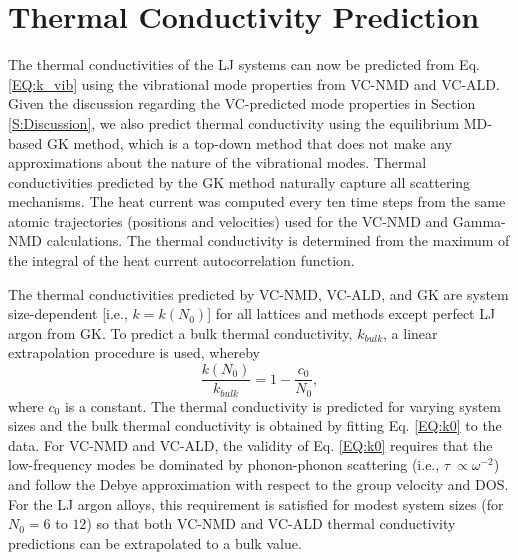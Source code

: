 

\section{\label{S:Thermal Conductivity}Thermal Conductivity Prediction}

The thermal conductivities of the LJ systems can now be predicted from 
Eq. \eqref{EQ:k_vib} using the vibrational mode properties 
from VC-NMD and VC-ALD. Given the discussion regarding the 
VC-predicted mode properties in Section \ref{S:Discussion}, 
we also predict thermal conductivity using the equilibrium 
MD-based GK method, which is a top-down method that does not make any 
approximations about the nature of the vibrational modes. 
Thermal conductivities predicted by the GK method 
naturally capture all scattering mechanisms.
\cite{landry_complex_2008,he_thermal_2011,he_lattice_2012} 
The heat current was computed every ten time steps from the same atomic 
trajectories (positions and velocities) used for the VC-NMD and 
Gamma-NMD calculations.  The thermal conductivity is 
determined from the maximum of the integral of the heat 
current autocorrelation function.

The thermal conductivities predicted by VC-NMD, VC-ALD, and GK are system 
size-dependent [i.e., $k = k(N_0)$] for all lattices and methods except 
perfect LJ argon from GK.\cite{mcgaughey_quantitative_2004} 
To predict a bulk thermal conductivity, $k_{bulk}$,  
a linear extrapolation procedure is 
used, whereby 
\begin{equation}\label{EQ:k0}
\frac{k(N_0)}{k_{bulk}} = 1 - \frac{c_0}{N_0},
\end{equation}
where $c_0$ is a constant.\cite{turney_predicting_2009,esfarjani_heat_2011,shiomi_thermal_2011} The thermal conductivity 
is predicted for varying system sizes and the bulk thermal conductivity is 
obtained by fitting Eq. \eqref{EQ:k0} to the data. 
For VC-NMD and VC-ALD, the validity of Eq. \eqref{EQ:k0}  
requires that the low-frequency modes be dominated by 
phonon-phonon scattering (i.e., $\tau\ \propto \omega^{-2}$) and  
follow the Debye approximation 
with respect to the group velocity and DOS.
\cite{shiomi_thermal_2011,esfarjani_heat_2011} For the LJ 
argon alloys, this requirement is satisfied for modest system sizes 
(for $N_0 = 6$ to $12$) so that both VC-NMD and VC-ALD thermal 
conductivity predictions can be extrapolated to a bulk value. 

